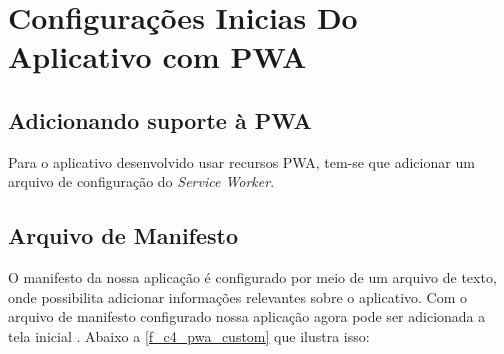 \section{Configurações Inicias Do Aplicativo com PWA}

\subsection*{Adicionando suporte à PWA}
 Para o aplicativo desenvolvido usar recursos PWA, tem-se que adicionar um  arquivo de configuração do \textit{Service Worker}.

\subsection{Arquivo de Manifesto}
O manifesto da nossa aplicação é configurado por meio de um arquivo de texto, onde possibilita adicionar informações relevantes sobre o aplicativo. Com o arquivo de manifesto configurado nossa aplicação agora pode ser adicionada a tela inicial \cite{manifestfile}. Abaixo a \autoref{f_c4_pwa_custom} que ilustra isso:

